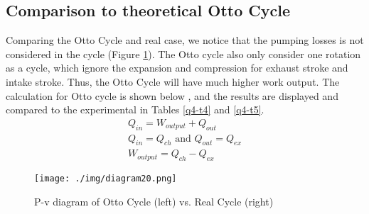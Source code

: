\subsection*{Comparison to theoretical Otto Cycle}
Comparing the Otto Cycle and real case, we notice that the pumping losses is not considered in the cycle (Figure \ref{q4-f5}). The Otto cycle also only consider one rotation as a cycle, which ignore the expansion and compression for exhaust stroke and intake stroke. Thus, the Otto Cycle will have much higher work output. The calculation for Otto cycle is shown below \cite{q4-r4}, and the results are displayed and compared to the experimental in Tables \ref{q4-t4} and \ref{q4-t5}.
\begin{eqnarray}
    Q_{in} = W_{output} + Q_{out}\\
    Q_{in} = Q_{ch} \textrm{ and } Q_{out} = Q_{ex}\\
    W_{output} = Q_{ch} - Q_{ex}
\end{eqnarray}
\begin{figure}[H]
    \centering
    \texttt{[image: ./img/diagram20.png]}
    \caption{P-v diagram of Otto Cycle (left) vs. Real Cycle (right)}
    \label{q4-f5}
\end{figure}

